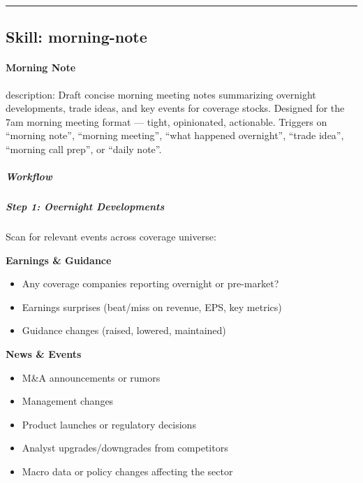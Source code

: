 \documentclass[11pt]{article}
\begin{document}
\vspace{0.8em}\hrule\vspace{0.8em}

\subsection{Skill: morning-note}\label{file:earnings-reviewer-skills-morning-note-SKILL-md}

\paragraph{Morning Note}\mbox{}\par

description: Draft concise morning meeting notes summarizing overnight developments, trade ideas, and key events for coverage stocks. Designed for the 7am morning meeting format — tight, opinionated, actionable. Triggers on ``morning note'', ``morning meeting'', ``what happened overnight'', ``trade idea'', ``morning call prep'', or ``daily note''.


\subparagraph{Workflow}\mbox{}\par

\subparagraph{Step 1: Overnight Developments}\mbox{}\par

Scan for relevant events across coverage universe:


\textbf{Earnings \& Guidance}

\begin{itemize}[leftmargin=*,itemsep=2pt,topsep=2pt]
\item {} Any coverage companies reporting overnight or pre-market?
\item {} Earnings surprises (beat/miss on revenue, EPS, key metrics)
\item {} Guidance changes (raised, lowered, maintained)
\end{itemize}

\textbf{News \& Events}

\begin{itemize}[leftmargin=*,itemsep=2pt,topsep=2pt]
\item {} M\&A announcements or rumors
\item {} Management changes
\item {} Product launches or regulatory decisions
\item {} Analyst upgrades/downgrades from competitors
\item {} Macro data or policy changes affecting the sector
\end{itemize}
\end{document}
